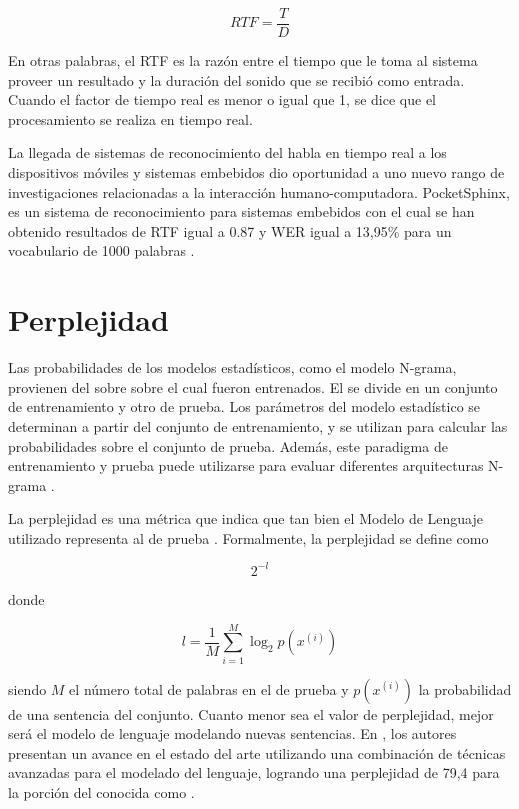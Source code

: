 \begin{equation}
\label{eq:rtf}
    RTF = \frac{T}{D}
\end{equation}

En otras palabras, el RTF es la razón entre el tiempo que le toma al sistema proveer un resultado y la
duración del sonido que se recibió como entrada. Cuando el factor de tiempo real es menor o igual que 1, 
se dice que el procesamiento se realiza en tiempo real.

La llegada de sistemas de reconocimiento del habla en tiempo real a los dispositivos m\'oviles y sistemas embebidos dio
oportunidad a uno nuevo rango de investigaciones relacionadas a la interacci\'on humano-computadora. PocketSphinx, es
un sistema de reconocimiento para sistemas embebidos con el cual se han obtenido resultados de RTF igual a 0.87 
y WER igual a 13,95\% para un vocabulario de 1000 palabras \cite{HugginsDainesPocketSphinx2006}.

\section{Perplejidad}
\label{sec:perplexity}

Las probabilidades de los modelos estad\'isticos, como el modelo N-grama, provienen del  sobre
sobre el cual fueron entrenados. El  se divide en un conjunto de entrenamiento y otro de prueba.
Los par\'ametros del modelo estad\'istico se determinan a partir del conjunto de entrenamiento, y se utilizan
para calcular las probabilidades sobre el conjunto de prueba. Adem\'as, este paradigma de entrenamiento y prueba
puede utilizarse para evaluar diferentes arquitecturas N-grama \cite{Jurafsky}.

La perplejidad es una m\'etrica que indica que tan bien el Modelo de Lenguaje utilizado representa al  
de prueba \cite{RosenfeldStatistical1997}. Formalmente, la perplejidad se define como

\begin{equation*}
    2^{-l}
\end{equation*}

donde

\begin{equation*}
    l = \frac{1}{M}\sum_{i=1}^{M}\log_2p(x^{(i)})
\end{equation*}

siendo $M$ el n\'umero total de palabras en el  de prueba y $p(x^{(i)})$ la probabilidad de una 
sentencia del conjunto. Cuanto menor sea el valor de perplejidad, mejor ser\'a el modelo de lenguaje modelando
nuevas sentencias. En \cite{MikolovEmpirical2011}, los autores presentan un avance en el estado del arte
utilizando una combinaci\'on de t\'ecnicas avanzadas para el modelado del lenguaje, logrando una perplejidad
de 79,4 para la porci\'on del  conocida como .
